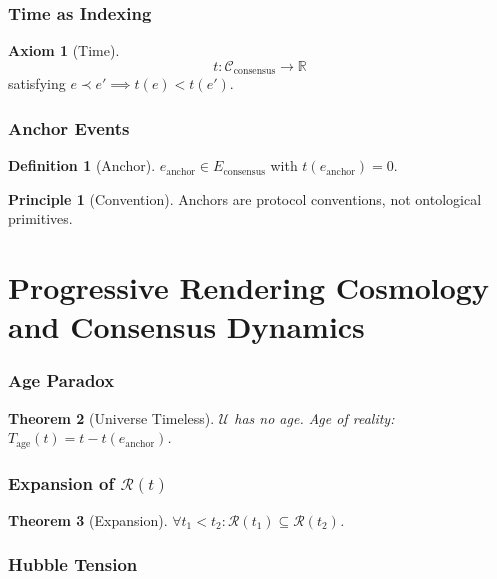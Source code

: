 \documentclass[12pt,a4paper]{article}
\numberwithin{equation}{section}
\theoremstyle{plain}
\newtheorem{theorem}{Theorem}[section]
\theoremstyle{definition}
\newtheorem{definition}[theorem]{Definition}
\newtheorem{axiom}{Axiom}[section]
\newtheorem{principle}{Principle}[section]
\theoremstyle{remark}
\newcommand{\Universe}{\ensuremath{\mathcal{U}}}
\newcommand{\Reality}{\ensuremath{\mathcal{R}}}
\newcommand{\Chain}{\ensuremath{\mathcal{C}}}
\newcommand{\Tage}{\ensuremath{T_{\mathrm{age}}}}
\begin{document}
\section{Time as Indexing}

\begin{axiom}[Time]
\label{ax:time}
\[
\boxed{t : \Chain_{\mathrm{consensus}} \to \mathbb{R}}
\]
satisfying $e \prec e' \implies t(e) < t(e')$.
\end{axiom}

\section{Anchor Events}

\begin{definition}[Anchor]
$e_{\mathrm{anchor}} \in E_{\mathrm{consensus}}$ with $t(e_{\mathrm{anchor}}) = 0$.
\end{definition}

\begin{principle}[Convention]
Anchors are protocol conventions, not ontological primitives.
\end{principle}

\part{Progressive Rendering Cosmology and Consensus Dynamics}
\label{part:cosmology}

\section{Age Paradox}

\begin{theorem}[Universe Timeless]
$\Universe$ has no age. Age of reality: $\Tage(t) = t - t(e_{\mathrm{anchor}})$.
\end{theorem}

\section{Expansion of $\Reality(t)$}

\begin{theorem}[Expansion]
$\forall t_1 < t_2: \Reality(t_1) \subseteq \Reality(t_2)$.
\end{theorem}

\section{Hubble Tension}
\end{document}
